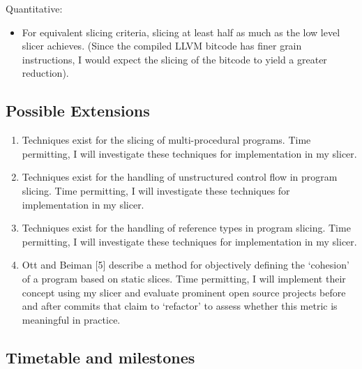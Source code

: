 Quantitative:

\begin{itemize}
\tightlist
\item
  For equivalent slicing criteria, slicing at least half as much as the
  low level slicer achieves. (Since the compiled LLVM bitcode has finer
  grain instructions, I would expect the slicing of the bitcode to yield
  a greater reduction).
\end{itemize}

\subsection{Possible Extensions}\label{possible-extensions}

\begin{enumerate}
\def\labelenumi{\arabic{enumi}.}
\item
  Techniques exist for the slicing of multi-procedural programs. Time
  permitting, I will investigate these techniques for implementation in
  my slicer.
\item
  Techniques exist for the handling of unstructured control flow in
  program slicing. Time permitting, I will investigate these techniques
  for implementation in my slicer.
\item
  Techniques exist for the handling of reference types in program
  slicing. Time permitting, I will investigate these techniques for
  implementation in my slicer.
\item
  Ott and Beiman {[}5{]} describe a method for objectively defining the
  `cohesion' of a program based on static slices. Time permitting, I
  will implement their concept using my slicer and evaluate prominent
  open source projects before and after commits that claim to `refactor'
  to assess whether this metric is meaningful in practice.
\end{enumerate}

\subsection{Timetable and milestones}\label{timetable-and-milestones}

